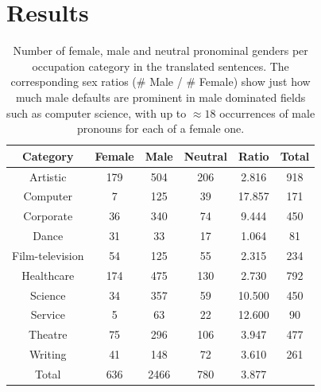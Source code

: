 \documentclass{article}
\begin{document}
\section{Results}

\begin{table}[H]
	\centering
	\begin{tabular}{|c|c|c|c|c|c|}
	\hline
	Category & Female & Male & Neutral & Ratio & Total \\ \hline
	\hline
	Artistic        & 179    & 504  & 206     & 2.816 	& 918 \\ \hline
	Computer        & 7      & 125  & 39      & 17.857 	& 171 \\ \hline
	Corporate       & 36     & 340  & 74      & 9.444 	& 450 \\ \hline
	Dance           & 31     & 33   & 17      & 1.064 	& 81  \\ \hline
	Film-television & 54     & 125  & 55      & 2.315 	& 234 \\ \hline
	Healthcare      & 174    & 475  & 130     & 2.730 	& 792 \\ \hline
	Science         & 34     & 357  & 59      & 10.500 	& 450 \\ \hline
	Service         & 5      & 63   & 22      & 12.600 	& 90  \\ \hline
	Theatre         & 75     & 296  & 106     & 3.947 	& 477 \\ \hline
	Writing         & 41     & 148  & 72      & 3.610 	& 261 \\ \hline
	\hline
	Total           & 636    & 2466 & 780     & 3.877   &    \\ \hline
	\end{tabular}
	\label{tab:gender-by-category}
	\caption{Number of female, male and neutral pronominal genders per occupation category in the translated sentences. The corresponding sex ratios (\# Male / \# Female) show just how much male defaults are prominent in male dominated fields such as computer science, with up to $\approx 18$ occurrences of male pronouns for each of a female one.}
\end{table}
\end{document}
